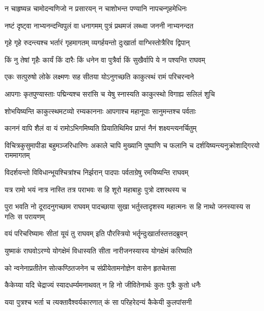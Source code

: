 \twolineshloka
{न चाहृष्यन्न चामोदन्वणिजो न प्रसारयन्}
{न चाशोभन्त पण्यानि नापचन्गृहमेधिनः} %

\twolineshloka
{नष्टं दृष्ट्वा नाभ्यनन्दन्विपुलं वा धनागमम्}
{पुत्रं प्रथमजं लब्ध्वा जननी नाभ्यनन्दत} %

\twolineshloka
{गृहे गृहे रुदन्त्यश्च भर्तारं गृहमागतम्}
{व्यगर्हयन्तो दुःखार्ता वाग्भिस्तोत्रैरिव द्विपान्} %

\twolineshloka
{किं नु तेषां गृहैः कार्यं किं दारैः किं धनेन वा}
{पुत्रैर्वा किं सुखैर्वापि ये न पश्यन्ति राघवम्} %

\twolineshloka
{एकः सत्पुरुषो लोके लक्ष्मणः सह सीतया}
{योऽनुगच्छति काकुत्स्थं रामं परिचरन्वने} %

\twolineshloka
{आपगाः कृतपुण्यास्ताः पद्मिन्यश्च सरांसि च}
{येषु स्नास्यति काकुत्स्थो विगाह्य सलिलं शुचि} %

\twolineshloka
{शोभयिष्यन्ति काकुत्स्थमटव्यो रम्यकाननाः}
{आपगाश्च महानूपाः सानुमन्तश्च पर्वताः} %

\twolineshloka
{काननं वापि शैलं वा यं रामोऽभिगमिष्यति}
{प्रियातिथिमिव प्राप्तं नैनं शक्ष्यन्त्यनर्चितुम्} %

\threelineshloka
{विचित्रकुसुमापीडा बहुमञ्जरिधारिणः}
{अकाले चापि मुख्यानि पुष्पाणि च फलानि च}
{दर्शयिष्यन्त्यनुक्रोशाद्गिरयो राममागतम्} %

\twolineshloka
{विदर्शयन्तो विविधान्भूयश्चित्रांश्च निर्झरान्}
{पादपाः पर्वताग्रेषु रमयिष्यन्ति राघवम्} %

\twolineshloka
{यत्र रामो भयं नात्र नास्ति तत्र पराभवः}
{स हि शूरो महाबाहुः पुत्रो दशरथस्य च} %

\threelineshloka
{पुरा भवति नो दूरादनुगच्छाम राघवम्}
{पादच्छाया सुखा भर्तुस्तादृशस्य महात्मनः}
{स हि नाथो जनस्यास्य स गतिः स परायणम्} %

\twolineshloka
{वयं परिचरिष्यामः सीतां यूयं तु राघवम्}
{इति पौरस्त्रियो भर्तॄन्दुःखार्तास्तत्तदब्रुवन्} %

\twolineshloka
{युष्माकं राघवोऽरण्ये योगक्षेमं विधास्यति}
{सीता नारीजनस्यास्य योगक्षेमं करिष्यति} %

\twolineshloka
{को न्वनेनाप्रतीतेन सोत्कण्ठितजनेन च}
{संप्रीयेतामनोज्ञेन वासेन हृतचेतसा} %

\twolineshloka
{कैकेय्या यदि चेद्राज्यं स्यादधर्म्यमनाथवत्}
{न हि नो जीवितेनार्थः कुतः पुत्रैः कुतो धनैः} %

\twolineshloka
{यया पुत्रश्च भर्ता च त्यक्तावैश्वर्यकारणात्}
{कं सा परिहरेदन्यं कैकेयी कुलपांसनी} %

